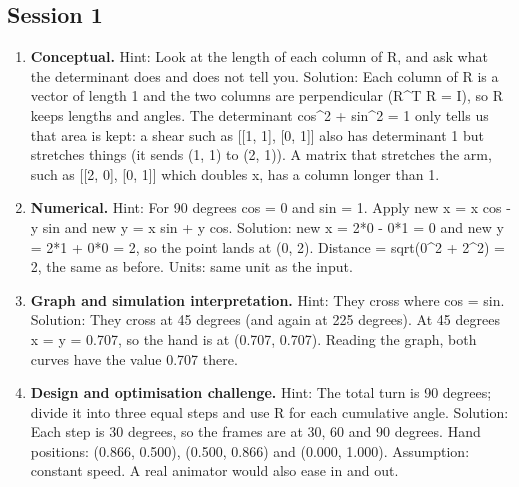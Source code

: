 \documentclass[11pt,a4paper]{article}
\begin{document}
\subsection*{Session 1}
\begin{enumerate}[nosep]
\item \textbf{Conceptual.} Hint: Look at the length of each column of R, and ask what the determinant does and does not tell you. Solution: Each column of R is a vector of length 1 and the two columns are perpendicular (R\textasciicircum{}T R = I), so R keeps lengths and angles. The determinant cos\textasciicircum{}2 + sin\textasciicircum{}2 = 1 only tells us that area is kept: a shear such as [[1, 1], [0, 1]] also has determinant 1 but stretches things (it sends (1, 1) to (2, 1)). A matrix that stretches the arm, such as [[2, 0], [0, 1]] which doubles x, has a column longer than 1.
\item \textbf{Numerical.} Hint: For 90 degrees cos = 0 and sin = 1. Apply new x = x cos - y sin and new y = x sin + y cos. Solution: new x = 2*0 - 0*1 = 0 and new y = 2*1 + 0*0 = 2, so the point lands at (0, 2). Distance = sqrt(0\textasciicircum{}2 + 2\textasciicircum{}2) = 2, the same as before. Units: same unit as the input.
\item \textbf{Graph and simulation interpretation.} Hint: They cross where cos = sin. Solution: They cross at 45 degrees (and again at 225 degrees). At 45 degrees x = y = 0.707, so the hand is at (0.707, 0.707). Reading the graph, both curves have the value 0.707 there.
\item \textbf{Design and optimisation challenge.} Hint: The total turn is 90 degrees; divide it into three equal steps and use R for each cumulative angle. Solution: Each step is 30 degrees, so the frames are at 30, 60 and 90 degrees. Hand positions: (0.866, 0.500), (0.500, 0.866) and (0.000, 1.000). Assumption: constant speed. A real animator would also ease in and out.
\end{enumerate}
\end{document}

